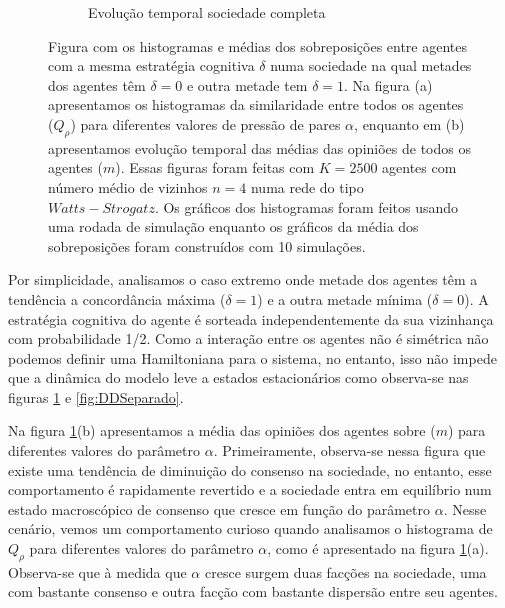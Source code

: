 \begin{figure}
\begin{subfigure}[]{\textwidth}
        \caption{Evolução temporal sociedade completa}
    \end{subfigure}
\label{fig:DDCompleto} \caption{Figura com os histogramas e médias dos
sobreposições entre agentes com a mesma estratégia cognitiva $\delta$
numa sociedade na qual metades dos agentes têm $\delta = 0$ e outra metade
tem $\delta =1$. Na figura (a) apresentamos os histogramas da similaridade
entre todos os agentes ($Q_\rho$) para diferentes valores de pressão
de pares $\alpha$, enquanto em (b) apresentamos evolução temporal das
médias das opiniões de todos os agentes ($m$). Essas figuras foram feitas
com $K=2500$ agentes com número médio de vizinhos $n=4$ numa rede do
tipo $Watts-Strogatz$. Os gráficos dos histogramas foram feitos usando uma
rodada de simulação enquanto os gráficos da média dos sobreposições
foram construídos com 10 simulações. }
\end{figure}

Por simplicidade, analisamos o caso extremo onde metade dos agentes têm a
tendência a concordância máxima ($\delta = 1$) e a outra metade mínima
($\delta = 0$). A estratégia cognitiva do agente é sorteada independentemente
da sua vizinhança com probabilidade 1/2.  Como a interação entre os
agentes não é simétrica não podemos definir uma Hamiltoniana para o
sistema, no entanto, isso não impede que a dinâmica do modelo leve a
estados estacionários como observa-se nas figuras \ref{fig:DDCompleto}
e \ref{fig:DDSeparado}.

Na figura \ref{fig:DDCompleto}(b) apresentamos a média das opiniões dos
agentes sobre  ($m$) para diferentes valores do parâmetro
$\alpha$. Primeiramente, observa-se nessa figura que existe uma tendência
de diminuição do consenso na sociedade, no entanto, esse comportamento é
rapidamente revertido e a sociedade entra em equilíbrio num estado macroscópico
de consenso que cresce em função do parâmetro $\alpha$. Nesse cenário,
vemos um comportamento curioso quando analisamos o histograma de $Q_\rho$
para diferentes valores do parâmetro $\alpha$, como é apresentado na figura
\ref{fig:DDCompleto}(a). Observa-se que à medida que $\alpha$ cresce surgem
duas facções na sociedade, uma com bastante consenso e outra facção 
com bastante dispersão entre seu agentes.

